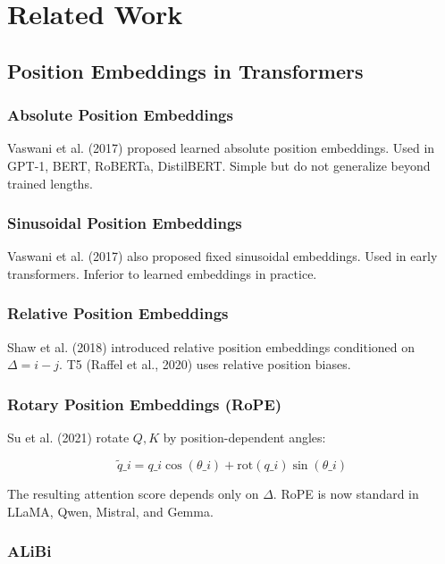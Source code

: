 
\section{Related Work}

\subsection{Position Embeddings in Transformers}

\subsubsection{Absolute Position Embeddings}

Vaswani et al. (2017) proposed learned absolute position embeddings. Used 
in GPT-1, BERT, RoBERTa, DistilBERT. Simple but do not generalize beyond 
trained lengths.

\subsubsection{Sinusoidal Position Embeddings}

Vaswani et al. (2017) also proposed fixed sinusoidal embeddings. Used in 
early transformers. Inferior to learned embeddings in practice.

\subsubsection{Relative Position Embeddings}

Shaw et al. (2018) introduced relative position embeddings conditioned on 
$\Delta = i - j$. T5 (Raffel et al., 2020) uses relative position biases.

\subsubsection{Rotary Position Embeddings (RoPE)}

Su et al. (2021) rotate $Q, K$ by position-dependent angles:

\[
\tilde{q}\_i = q\_i \cos(\theta\_i) + \mathrm{rot}(q\_i) \sin(\theta\_i)
\tag{2.1}
\]

The resulting attention score depends only on $\Delta$. RoPE is now 
standard in LLaMA, Qwen, Mistral, and Gemma.

\subsubsection{ALiBi}


